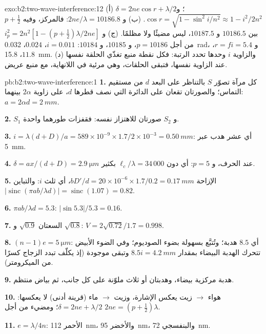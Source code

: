 \begin{solution}{exo:b2:two-wave-interference:12}
(أ) $\delta = 2ne\cos r + \lambda/2$؛ و $\cos r = \sqrt{1 - \sin^2i/n^2} \approx 1 - i^2/2n^2$.
(ب) و $2ne/\lambda = 10186.8$: فالمركز، وفيه $p + \tfrac12$ بين $10186.5$ و
$10187.5$، ليس مضيئًا ولا مظلمًا. (ج) و $i_p^2 = 2n^2[1 - (p + \tfrac12)\lambda/
2ne]$ من أجل $p = 10186$، و $10185$، و $10184$: $i = 0.011$، $0.024$، \qty{0.032}{rad}، و $r = fi
= 5.4$، $11.8$، \qty{15.8}{mm}. (د) والزاوية $i$ وحدها تحدد الرتبة: فكل
نقطة منبع تغذّي الحلقة نفسها عند الزاوية نفسها، فتبقى الحلقات، وهي مرئية
في اللانهاية، مع منبع عريض.
\end{solution}

\begin{solution}{pb:b2:two-wave-interference:1}
\textbf{1.} كل مرآة تصوّر $S$ بالتناظر على البعد $d$ من
مستقيم التماس؛ والصورتان تقعان على الدائرة التي نصف قطرها $d$، على
زاوية $2\alpha$ بينهما: $a = 2\alpha d = \qty{2}{mm}$.

\textbf{2.} $S_1$ و $S_2$ صورتان للاهتزاز نفسه: فقفزات
طورهما واحدة.

\textbf{3.} $i = \lambda(d + D)/a = 589 \times 10^{-9} \times 1.7/2 \times 10^{-3} = \qty{0.50}{mm}$: أي عشر
هدب عبر \qty{5}{mm}.

\textbf{4.} $\delta = ax/(d + D) = \qty{2.9}{\micro m}$ عند الحرف، و $p = 5$: أي دون
$\ell_c/\lambda = 34\,000$ بكثير.

\textbf{5.} الإزاحة $bD'/d = 20 \times 10^{-6} \times 1.7/0.2 = \qty{0.17}{mm}$، أي ثلث
$i$: والتباين $|\operatorname{sinc}(\pi ab/\lambda d)| = \operatorname{sinc}(1.07) = 0.82$.

\textbf{6.} $\pi ab/\lambda d = 5.3$: $|\sin5.3|/5.3 = 0.16$.

\textbf{7.} السعتان $\sqrt{0.9}$ و $\sqrt{0.8}$: $V = 2\sqrt{0.72}/1.7 = 0.998$.

\textbf{8.} $(n - 1)e = \qty{5}{\micro m}$: أي $8.5$ هدبة؛ وتُتبَّع بسهولة بضوء
الصوديوم؛ وفي الضوء الأبيض تتحرك الهدبة البيضاء بمقدار $8.5i = \qty{4.2}{mm}$
وتبقى موجودة (إذ يكلّف تبدد الزجاج كسرًا من
الميكرومتر).

\textbf{9.} هدبة مركزية بيضاء، وهدبتان أو ثلاث ملوّنة على
كل جانب، ثم بياض منتظم.

\textbf{10.} هواء $\to$ زيت يعكس الإشارة، وزيت $\to$ ماء (قرينة أدنى) لا يعكسها:
$\delta = 2ne + \lambda/2$؛ ومضيء من أجل $2ne = (p + \tfrac12)\lambda$.

\textbf{11.} $e = \lambda/4n$: الأحمر \qty{112}{nm}، والأخضر \qty{95}{nm}، والبنفسجي \qty{72}{nm}.


\end{solution}
